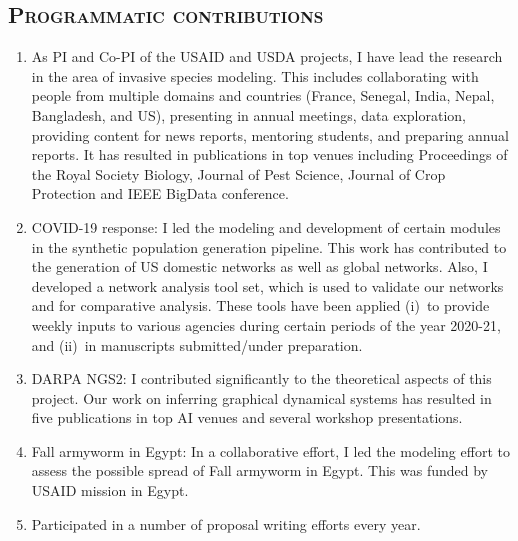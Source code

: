 \documentclass[margin,10pt]{res} %
\begin{document}
\begin{resume}
\section{\textnormal{\textsc{Programmatic contributions}}}
\begin{enumerate}[$\circ$]
\item As PI and Co-PI of the USAID and USDA projects, I have lead the
research in the area of invasive species modeling. This includes
collaborating with people from multiple domains and countries (France,
Senegal, India, Nepal, Bangladesh, and US), presenting in annual meetings,
data exploration, providing content for news reports, mentoring students,
and preparing annual reports. It has resulted in publications in top venues
including Proceedings of the Royal Society Biology, Journal of Pest
Science, Journal of Crop Protection and IEEE BigData conference.
\item COVID-19 response: I led the modeling and development of certain
modules in the synthetic population generation pipeline. This work has
contributed to the generation of US domestic networks as well as global
networks. Also, I developed a network analysis tool set, which is used to
validate our networks and for comparative analysis. These tools have been
applied (i)~to provide weekly inputs to various agencies during certain
periods of the year 2020-21, and (ii)~in manuscripts submitted/under
preparation.
\item DARPA NGS2: I contributed significantly to the theoretical aspects of
this project. Our work on inferring graphical dynamical systems has
resulted in five publications in top AI venues and several workshop
presentations.
\item Fall armyworm in Egypt: In a collaborative effort, I led the modeling
effort to assess the possible spread of Fall armyworm in Egypt. This was
funded by USAID mission in Egypt.
\item Participated in a number of proposal writing efforts every year.
\end{enumerate}


\end{resume}
\end{document}
